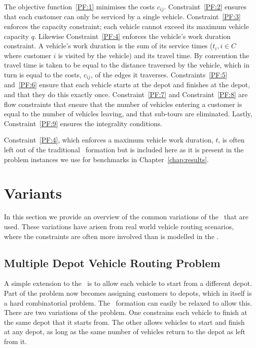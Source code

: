 The objective function~\eqref{PF:1} minimises the costs $c_{ij}$. Constraint~\eqref{PF:2} ensures that each customer can only be serviced by a single vehicle. Constraint~\eqref{PF:3} enforces the capacity constraint; each vehicle cannot exceed its maximum vehicle capacity $q$. Likewise Constraint~\eqref{PF:4} enforces the vehicle's work duration constraint. A vehicle's work duration is the sum of its service times ($t_i, i \in C$ where customer $i$ is visited by the vehicle) and its travel time. By convention the travel time is taken to be equal to the distance traversed by the vehicle, which in turn is equal to the costs, $c_{ij}$, of the edges it traverses. Constraints~\eqref{PF:5} and~\eqref{PF:6} ensure that each vehicle starts at the depot and finishes at the depot, and that they do this exactly once. Constraint~\eqref{PF:7} and Constraint~\eqref{PF:8} are flow constraints that ensure that the number of vehicles entering a customer is equal to the number of vehicles leaving, and that sub-tours are eliminated. Lastly, Constraint~\eqref{PF:9} ensures the integrality conditions.

Constraint~\eqref{PF:4}, which enforces a maximum vehicle work duration, $t$, is often left out of the traditional \CVRP\ formation but is included here as it is present in the problem instances we use for benchmarks in Chapter~\ref{chap:results}.

\section{Variants}
\label{sec:variants}

In this section we provide an overview of the common variations of the \VRP\ that are used. These variations have arisen from real world vehicle routing scenarios, where the constraints are often more involved than is modelled in the \CVRP. 

\subsection{Multiple Depot Vehicle Routing Problem}

A simple extension to the \CVRP\ is to allow each vehicle to start from a different depot. Part of the problem now becomes assigning customers to depots, which in itself is a hard combinatorial problem. The \CVRP\ formation can easily be relaxed to allow this. There are two variations of the problem. One constrains each vehicle to finish at the same depot that it starts from. The other allows vehicles to start and finish at any depot, as long as the same number of vehicles return to the depot as left from it.

